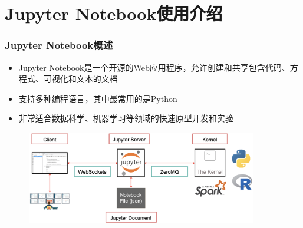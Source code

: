 \section{\rm{Jupyter Notebook}使用介绍}
\begin{frame}
	\frametitle{\textrm{Jupyter Notebook}概述}
    \begin{itemize}
	    \item \textrm{Jupyter Notebook}是一个开源的\textrm{Web}应用程序，允许创建和共享包含代码、方程式、可视化和文本的文档
	    \item 支持多种编程语言，其中最常用的是\textrm{Python}
        \item 非常适合数据科学、机器学习等领域的快速原型开发和实验
    \end{itemize}
\begin{figure}[h!]
\centering
\includegraphics[height=1.6in, width=4.0in, viewport=0 0 1170 472,clip]{Figures/Jupyter_Architecture.png}
\label{Jupyter_notebook}
\end{figure}
\end{frame}
%
